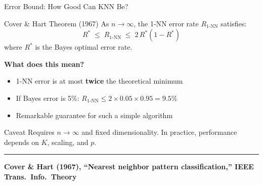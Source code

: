 \documentclass[8pt,aspectratio=169]{beamer}
\newcommand{\bottomnote}[1]{%
\vfill
\vspace{-2mm}
\textcolor{mllavender2}{\rule{\textwidth}{0.4pt}}
\vspace{1mm}
\footnotesize
\textbf{#1}
}
\newenvironment{compactlist}{%
  \begin{itemize}%
    \setlength{\itemsep}{2pt}%
    \setlength{\parskip}{0pt}%
    \setlength{\parsep}{0pt}%
}{%
  \end{itemize}%
}
\newcommand{\highlight}[1]{\textcolor{mlorange}{\textbf{#1}}}
\begin{document}
\begin{frame}[t]{Error Bound: How Good Can KNN Be?}
\begin{block}{Cover \& Hart Theorem (1967)}
As $n \to \infty$, the 1-NN error rate $R_{1\text{-NN}}$ satisfies:
\[
R^* \;\leq\; R_{1\text{-NN}} \;\leq\; 2\,R^*\!\left(1 - R^*\right)
\]
where $R^*$ is the Bayes optimal error rate.
\end{block}

\vspace{3mm}
\footnotesize
\textbf{What does this mean?}
\begin{compactlist}
\item \footnotesize 1-NN error is at most \highlight{twice} the theoretical minimum
\item \footnotesize If Bayes error is 5\%: $R_{1\text{-NN}} \leq 2 \times 0.05 \times 0.95 = 9.5\%$
\item \footnotesize Remarkable guarantee for such a simple algorithm
\end{compactlist}

\vspace{2mm}
\begin{block}{Caveat}
\footnotesize Requires $n \to \infty$ and fixed dimensionality. In practice, performance depends on $K$, scaling, and $p$.
\end{block}
\bottomnote{Cover \& Hart (1967), ``Nearest neighbor pattern classification,'' IEEE Trans.\ Info.\ Theory}
\end{frame}

\end{document}
